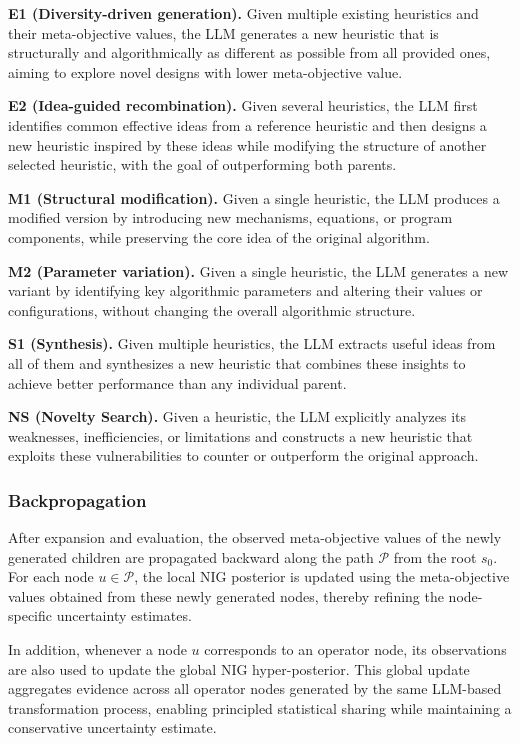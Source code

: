 \documentclass[sigconf,anonymous]{aamas}
\begin{document}
\textbf{E1 (Diversity-driven generation).}
Given multiple existing heuristics and their meta-objective values, the LLM generates a new heuristic that is structurally and algorithmically as different as possible from all provided ones, aiming to explore novel designs with lower meta-objective value.

\textbf{E2 (Idea-guided recombination).}
Given several heuristics, the LLM first identifies common effective ideas from a reference heuristic and then designs a new heuristic inspired by these ideas while modifying the structure of another selected heuristic, with the goal of outperforming both parents.

\textbf{M1 (Structural modification).}
Given a single heuristic, the LLM produces a modified version by introducing new mechanisms, equations, or program components, while preserving the core idea of the original algorithm.

\textbf{M2 (Parameter variation).}
Given a single heuristic, the LLM generates a new variant by identifying key algorithmic parameters and altering their values or configurations, without changing the overall algorithmic structure.

\textbf{S1 (Synthesis).}
Given multiple heuristics, the LLM extracts useful ideas from all of them and synthesizes a new heuristic that combines these insights to achieve better performance than any individual parent.

\textbf{NS (Novelty Search).}
Given a heuristic, the LLM explicitly analyzes its weaknesses, inefficiencies, or limitations and constructs a new heuristic that exploits these vulnerabilities to counter or outperform the original approach.

\subsubsection{Backpropagation}

After expansion and evaluation, the observed meta-objective values of the newly generated children are propagated backward along the path $\mathcal{P}$ from the root $s_0$. For each node $u \in \mathcal{P}$, the local NIG posterior is updated using the meta-objective values obtained from these newly generated nodes, thereby refining the node-specific uncertainty estimates.

In addition, whenever a node $u$ corresponds to an operator node, its observations are also used to update the global NIG hyper-posterior.
This global update aggregates evidence across all operator nodes generated by the same LLM-based transformation process, enabling principled statistical sharing while maintaining a conservative uncertainty estimate.
\end{document}
